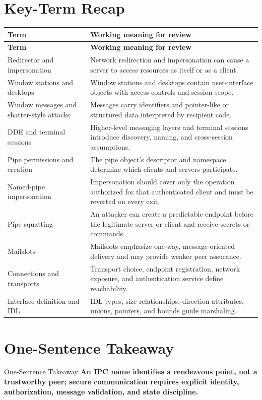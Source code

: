 \documentclass[11pt,letterpaper]{article}
\begin{document}
\section{Key-Term Recap}
\begin{longtable}{>{\raggedright\arraybackslash}p{}p{}}
\toprule
\textbf{Term} & \textbf{Working meaning for review} \\
\midrule
\endfirsthead
\toprule
\textbf{Term} & \textbf{Working meaning for review} \\
\midrule
\endhead
Redirector and impersonation & Network redirection and impersonation can cause a server to access resources as itself or as a client. \\
Window stations and desktops & Window stations and desktops contain user-interface objects with access controls and session scope. \\
Window messages and shatter-style attacks & Messages carry identifiers and pointer-like or structured data interpreted by recipient code. \\
DDE and terminal sessions & Higher-level messaging layers and terminal sessions introduce discovery, naming, and cross-session assumptions. \\
Pipe permissions and creation & The pipe object's descriptor and namespace determine which clients and servers participate. \\
Named-pipe impersonation & Impersonation should cover only the operation authorized for that authenticated client and must be reverted on every exit. \\
Pipe squatting & An attacker can create a predictable endpoint before the legitimate server or client and receive secrets or commands. \\
Mailslots & Mailslots emphasize one-way, message-oriented delivery and may provide weaker peer assurance. \\
Connections and transports & Transport choice, endpoint registration, network exposure, and authentication service define reachability. \\
Interface definition and IDL & IDL types, size relationships, direction attributes, unions, pointers, and bounds guide marshaling. \\
\bottomrule
\end{longtable}
\section{One-Sentence Takeaway}
\begin{CornellExamBox}{One-Sentence Takeaway}
\textbf{An IPC name identifies a rendezvous point, not a trustworthy peer; secure communication requires explicit identity, authorization, message validation, and state discipline.}
\end{CornellExamBox}
\end{document}
